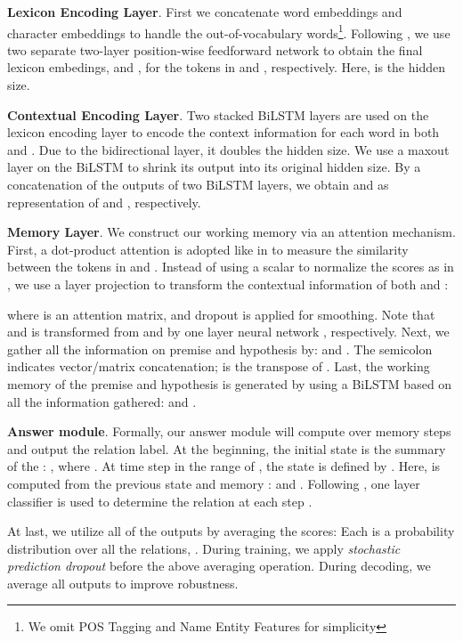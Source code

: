 \documentclass[11pt,a4paper]{article}
\begin{document}
\noindent\textbf{Lexicon Encoding Layer}. 
First we concatenate word embeddings and character embeddings to handle the out-of-vocabulary words\footnote{We omit POS Tagging and Name Entity Features for simplicity}.  
Following \cite{liu18san}, we use two separate two-layer position-wise feedforward network  \cite{vaswani2017attention} to obtain the final lexicon embedings,  and , for the tokens in  and , respectively. Here,  is the hidden size.

\noindent\textbf{Contextual Encoding Layer}. Two stacked BiLSTM layers are used on the lexicon encoding layer to encode the context information for each word in both  and . Due to the bidirectional layer, it doubles the hidden size. We use a maxout layer \cite{goodfellow2013maxout} on the BiLSTM to shrink its output into its original hidden size. By a concatenation of the outputs of two BiLSTM layers, we obtain  and  as representation of  and , respectively.

\noindent\textbf{Memory Layer}. We construct our working memory via an attention mechanism. 
First, a dot-product attention is adopted like in \cite{vaswani2017attention} to measure the similarity between the tokens in  and .
Instead of using a scalar to normalize the scores as in \cite{vaswani2017attention}, we use a layer projection to transform the contextual information of both  and :

where  is an attention matrix, and dropout is applied for smoothing. 
Note that  and  is transformed from  and  by one layer neural network , respectively. 
Next, we gather all the information on premise and hypothesis by:  and .
The semicolon  indicates vector/matrix concatenation;  is the transpose of .
Last, the working memory of the premise and hypothesis is generated by using a BiLSTM based on all the information gathered:  and .



\noindent\textbf{Answer module}.
Formally, our answer module will compute over  memory steps and output the relation label. 
At the beginning, the initial state  is the summary of the : , where . At time step  in the range of , the state is defined by . 
Here,  is computed from the previous state  and memory :  and . 
Following \cite{mou2015natural}, one layer classifier is used to determine the relation at each step . 



At last, we utilize all of the  outputs by averaging the scores:
\vspace{-0.1cm}
Each  is a probability distribution over all the relations, . During training, we apply \emph{stochastic prediction dropout} before the above averaging operation. During decoding, we average all outputs to improve robustness. 
\end{document}

